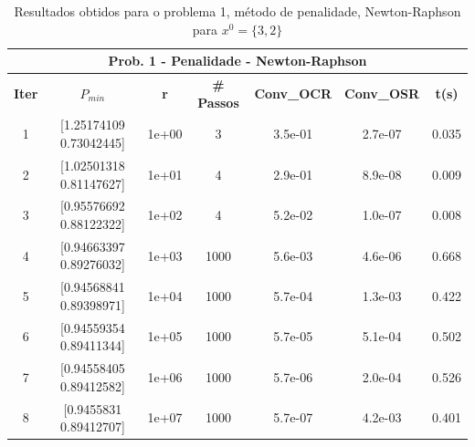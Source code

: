 \documentclass[10pt, a4paper]{article}
\begin{document}
\vspace{5mm}
\begin{table}[H]
  \begin{center}
    \begin{tabular}{c|c|c|c|c|c|c}
      \multicolumn{7}{c}{\textbf{Prob. 1 - Penalidade - Newton-Raphson}}\\
      \hline
      \textbf{Iter} & \textbf{$P_{min}$} & \textbf{r} & \textbf{\# Passos} & \textbf{Conv\_OCR} & \textbf{Conv\_OSR} & \textbf{t(s)}\\
      \hline
        1& [1.25174109 0.73042445]& 1e+00& 3& 3.5e-01& 2.7e-07& 0.035     \\
        2& [1.02501318 0.81147627]& 1e+01& 4& 2.9e-01& 8.9e-08& 0.009\\
        3& [0.95576692 0.88122322]& 1e+02& 4& 5.2e-02& 1.0e-07& 0.008\\
        4& [0.94663397 0.89276032]& 1e+03& 1000& 5.6e-03& 4.6e-06& 0.668\\
        5& [0.94568841 0.89398971]& 1e+04& 1000& 5.7e-04& 1.3e-03& 0.422\\
        6& [0.94559354 0.89411344]& 1e+05& 1000& 5.7e-05& 5.1e-04& 0.502\\
        7& [0.94558405 0.89412582]& 1e+06& 1000& 5.7e-06& 2.0e-04& 0.526\\
        8& [0.9455831  0.89412707]& 1e+07& 1000& 5.7e-07& 4.2e-03& 0.401\\
    \end{tabular}
  \end{center}
  \caption{Resultados obtidos para o problema 1, método de penalidade, Newton-Raphson para $x^0=\{3,2\}$}
\end{table}
\end{document}
